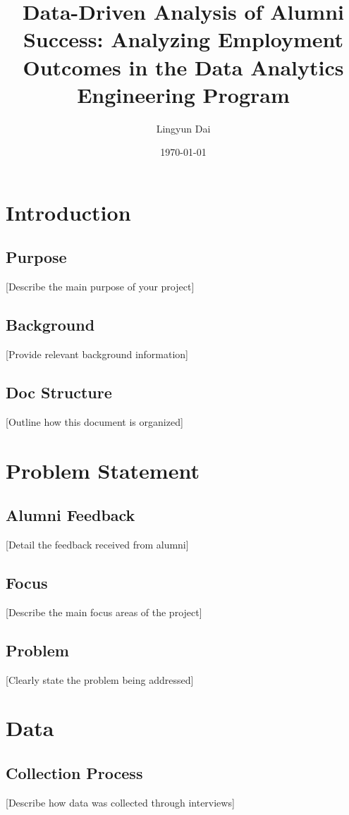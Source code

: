 \documentclass[12pt,a4paper]{article}
\title{\textbf{Data-Driven Analysis of Alumni Success: Analyzing Employment Outcomes in the Data Analytics Engineering Program}}
\author{Lingyun Dai}
\date{\today}
\begin{document}
\maketitle
\tableofcontents
\newpage

\section{Introduction}
\subsection{Purpose}
[Describe the main purpose of your project]

\subsection{Background}
[Provide relevant background information]

\subsection{Doc Structure}
[Outline how this document is organized]

\section{Problem Statement}
\subsection{Alumni Feedback}
[Detail the feedback received from alumni]

\subsection{Focus}
[Describe the main focus areas of the project]

\subsection{Problem}
[Clearly state the problem being addressed]

\section{Data}
\subsection{Collection Process}
[Describe how data was collected through interviews]
\end{document}
